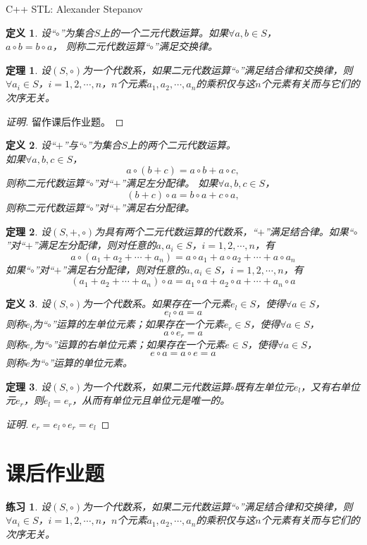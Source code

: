 \documentclass{article}
\newtheorem{Def}{定义}
\newtheorem{Thm}{定理}
\newtheorem{Exercise}{练习}
\begin{document}
\begin{CJK*}{UTF8}{gbsn}
C++ STL: Alexander Stepanov
 \begin{Def}
    设“$\circ$”为集合$S$上的一个二元代数运算。如果$\forall a, b \in S$，\\$a \circ b = b \circ a$， 则称二元代数运算“$\circ$”满足交换律。
  \end{Def}
  \begin{Thm}
    设$(S,\circ)$为一个代数系，如果二元代数运算“$\circ$”满足结合律和交换律，则$\forall a_i\in S$，$i=1,2,\cdots,n$，$n$个元素$a_1,a_2,\cdots,a_n$的乘积仅与这$n$个元素有关而与它们的次序无关。
  \end{Thm}
  \begin{proof}[证明]
留作课后作业题。    
  \end{proof}
  \begin{Def}
    设“$+$”与“$\circ$”为集合$S$上的两个二元代数运算。\\如果$\forall a, b, c \in S$，\[a \circ (b + c) = a \circ b + a \circ c,\] 则称二元代数运算“$\circ$”对“$+$”满足左分配律。
    如果$\forall a, b, c \in S$，\[(b + c)\circ a = b \circ a + c \circ a,\] 则称二元代数运算“$\circ$”对“$+$”满足右分配律。
  \end{Def}
  \begin{Thm}
    设$(S,+,\circ)$为具有两个二元代数运算的代数系，“$+$”满足结合律。如果“$\circ$”对“$+$”满足左分配律，则对任意的$a,a_i\in S$，$i=1,2,\cdots,n$，有
    \[a\circ (a_1+a_2+\cdots+a_n) = a\circ a_1 + a\circ a_2 + \cdots + a\circ a_n\]
    如果“$\circ$”对“$+$”满足右分配律，则对任意的$a,a_i\in S$，$i=1,2,\cdots,n$，有
    \[(a_1+a_2+\cdots+a_n)\circ a  = a_1\circ a + a_2\circ a + \cdots + a_n\circ a\]
  \end{Thm}
  \begin{Def}
    设$(S,\circ)$为一个代数系。如果存在一个元素$e_l\in S$，使得$\forall a\in S$，
    \[e_l\circ a = a\]
    则称$e_l$为“$\circ$”运算的左单位元素；如果存在一个元素$e_r\in S$，使得$\forall a\in S$，
    \[a\circ e_r = a\]
    则称$e_r$为“$\circ$”运算的右单位元素；如果存在一个元素$e\in S$，使得$\forall a\in S$，
    \[e\circ a = a\circ e = a\]
    则称$e$为“$\circ$”运算的单位元素。
  \end{Def}
  \begin{Thm}
    设$(S,\circ)$为一个代数系，如果二元代数运算$\circ$既有左单位元$e_l$，又有右单位元$e_r$，则$e_l=e_r$，从而有单位元且单位元是唯一的。
  \end{Thm}
  \begin{proof}[证明]
    $e_r = e_l\circ e_r = e_l$
  \end{proof}
  \section{课后作业题}
  \begin{Exercise}
    设$(S,\circ)$为一个代数系，如果二元代数运算“$\circ$”满足结合律和交换律，则$\forall a_i\in S$，$i=1,2,\cdots,n$，$n$个元素$a_1,a_2,\cdots,a_n$的乘积仅与这$n$个元素有关而与它们的次序无关。
  \end{Exercise}


\end{CJK*}
\end{document}
